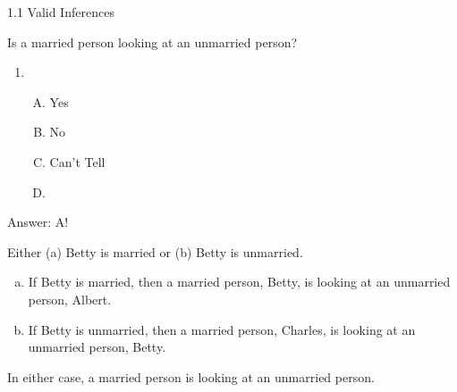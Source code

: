 \begin{frame}{1.1 Valid Inferences}
\begin{itemize}[<+->]
\begin{center}
{\begin{minipage}{.9\linewidth}
\begin{center}
	\end{center}



Is a married person looking at an unmarried person?

	\begin{enumerate}

		\item[]
			\begin{enumerate}[A.]



				\item Yes


\item No


\item Can't Tell

\item[]

\end{enumerate}
\end{enumerate}

	\end{minipage}
	}
	\end{center}


	\end{itemize}

\end{frame}

\begin{frame}{Answer: A!}


Either \begingroup\color{structure}(a) \endgroup Betty is married or  \begingroup\color{structure}(b) \endgroup  Betty is unmarried.




\begin{enumerate}[(a)]

\item If Betty is married, then a married person, Betty, is looking at an unmarried person, Albert.



\item If Betty is unmarried, then a married person, Charles, is looking at an unmarried person, Betty.

\end{enumerate}




In either case, a married person is looking at an unmarried person.

\end{frame}

